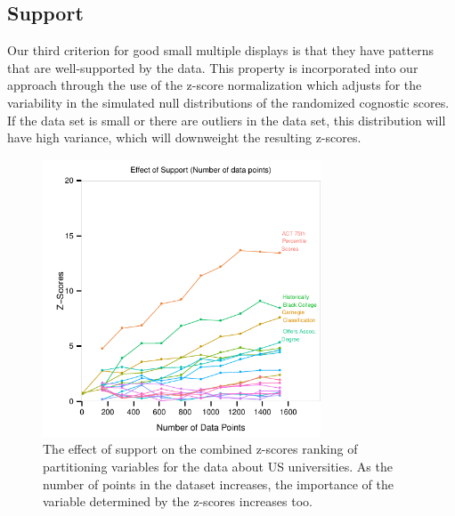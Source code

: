 

\subsection{Support}
Our third criterion for good small multiple displays is that they have patterns that are well-supported by the data. This property is incorporated into our approach through the use of the z-score normalization which adjusts for the variability in the simulated null distributions of the randomized cognostic scores. If the data set is small or there are outliers in the data set, this distribution will have high variance, which will downweight the resulting z-scores.

\begin{figure}
\centering
\includegraphics[width=3.25in,height=3.25in]{images/support-nogrid.pdf}
  \caption{The effect of support on the combined z-scores ranking of partitioning variables for the data about US universities. As the number of points in the dataset increases, the importance of the variable determined by the z-scores increases too. }
 \label{fig:support}
\end{figure}

